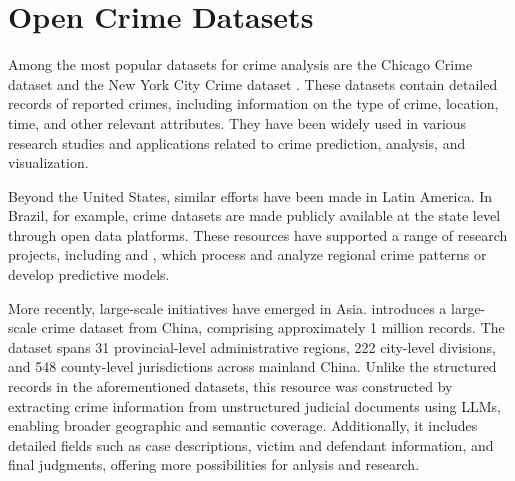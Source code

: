 




\section{Open Crime Datasets}

Among the most popular datasets for crime analysis are the Chicago Crime dataset \citep{ChicagoDataset} and the New York City Crime dataset \citep{NYCDataset}. These datasets contain detailed records of reported crimes, including information on the type of crime, location, time, and other relevant attributes. They have been widely used in various research studies and applications related to crime prediction, analysis, and visualization.

Beyond the United States, similar efforts have been made in Latin America. In Brazil, for example, crime datasets are made publicly available at the state level through open data platforms. These resources have supported a range of research projects, including \citep{Garcia2022CriPAV} and \citep{Waqar2025CrimePredictionGNN}, which process and analyze regional crime patterns or develop predictive models.

More recently, large-scale initiatives have emerged in Asia. \citep{Zhang2025CrimeDatasetChina} introduces a large-scale crime dataset from China, comprising approximately 1 million records. The dataset spans 31 provincial-level administrative regions, 222 city-level divisions, and 548 county-level jurisdictions across mainland China. Unlike the structured records in the aforementioned datasets, this resource was constructed by extracting crime information from unstructured judicial documents using LLMs, enabling broader geographic and semantic coverage. Additionally, it includes detailed fields such as case descriptions, victim and defendant information, and final judgments, offering more possibilities for anlysis and research.



